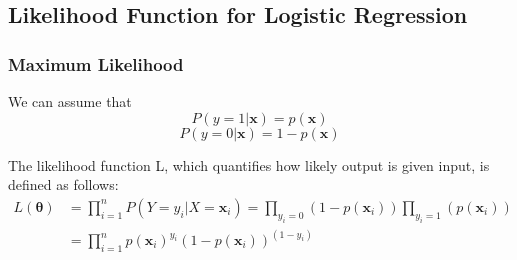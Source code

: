 \documentclass{beamer}
\begin{document}
\subsection{Likelihood Function for Logistic Regression}
\begin{frame}
\frametitle{Maximum Likelihood}

We can assume that
\[P(y = 1 | \mathbf{x}) = p(\mathbf{x})\]
\[P(y = 0 | \mathbf{x}) = 1- p(\mathbf{x})\]

The likelihood function L, which quantifies how likely output is given input, is defined as follows:
\begin{equation}
\begin{aligned}
L(\bm{\theta}) &= \prod_{i=1}^n P(Y = y_{i}  | X = \mathbf{x}_{i}) = \prod_{y_{i} = 0 } (1-p(\mathbf{x}_{i})) \prod_{y_{i} = 1 } (p(\mathbf{x}_{i})) \\
&= \prod_{i=1}^{n} p(\mathbf{x}_{i})^{y_{i}} (1-p(\mathbf{x}_{i}))^{(1-{y_{i}})}
\end{aligned}
\end{equation}
\end{frame}
\end{document}
